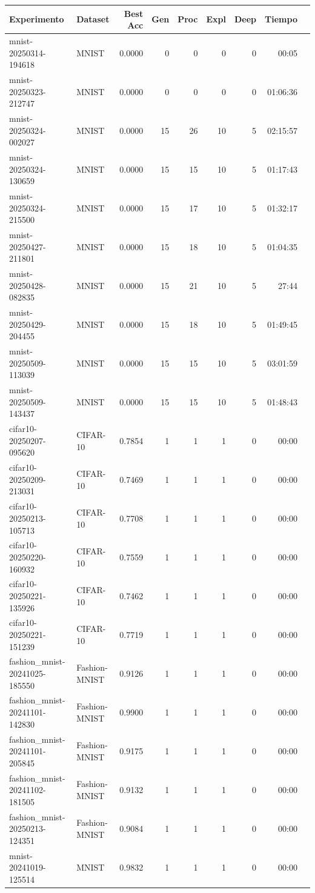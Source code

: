 \begin{tabular}{llrrrrrrr}
\toprule
Experimento & Dataset & Best Acc & Gen & Proc & Expl & Deep & Tiempo \\
\midrule
mnist-20250314-194618 & MNIST & 0.0000 & 0 & 0 & 0 & 0 & 00:05 \\
mnist-20250323-212747 & MNIST & 0.0000 & 0 & 0 & 0 & 0 & 01:06:36 \\
mnist-20250324-002027 & MNIST & 0.0000 & 15 & 26 & 10 & 5 & 02:15:57 \\
mnist-20250324-130659 & MNIST & 0.0000 & 15 & 15 & 10 & 5 & 01:17:43 \\
mnist-20250324-215500 & MNIST & 0.0000 & 15 & 17 & 10 & 5 & 01:32:17 \\
mnist-20250427-211801 & MNIST & 0.0000 & 15 & 18 & 10 & 5 & 01:04:35 \\
mnist-20250428-082835 & MNIST & 0.0000 & 15 & 21 & 10 & 5 & 27:44 \\
mnist-20250429-204455 & MNIST & 0.0000 & 15 & 18 & 10 & 5 & 01:49:45 \\
mnist-20250509-113039 & MNIST & 0.0000 & 15 & 15 & 10 & 5 & 03:01:59 \\
mnist-20250509-143437 & MNIST & 0.0000 & 15 & 15 & 10 & 5 & 01:48:43 \\
cifar10-20250207-095620 & CIFAR-10 & 0.7854 & 1 & 1 & 1 & 0 & 00:00 \\
cifar10-20250209-213031 & CIFAR-10 & 0.7469 & 1 & 1 & 1 & 0 & 00:00 \\
cifar10-20250213-105713 & CIFAR-10 & 0.7708 & 1 & 1 & 1 & 0 & 00:00 \\
cifar10-20250220-160932 & CIFAR-10 & 0.7559 & 1 & 1 & 1 & 0 & 00:00 \\
cifar10-20250221-135926 & CIFAR-10 & 0.7462 & 1 & 1 & 1 & 0 & 00:00 \\
cifar10-20250221-151239 & CIFAR-10 & 0.7719 & 1 & 1 & 1 & 0 & 00:00 \\
fashion_mnist-20241025-185550 & Fashion-MNIST & 0.9126 & 1 & 1 & 1 & 0 & 00:00 \\
fashion_mnist-20241101-142830 & Fashion-MNIST & 0.9900 & 1 & 1 & 1 & 0 & 00:00 \\
fashion_mnist-20241101-205845 & Fashion-MNIST & 0.9175 & 1 & 1 & 1 & 0 & 00:00 \\
fashion_mnist-20241102-181505 & Fashion-MNIST & 0.9132 & 1 & 1 & 1 & 0 & 00:00 \\
fashion_mnist-20250213-124351 & Fashion-MNIST & 0.9084 & 1 & 1 & 1 & 0 & 00:00 \\
mnist-20241019-125514 & MNIST & 0.9832 & 1 & 1 & 1 & 0 & 00:00 \\

\end{tabular}
